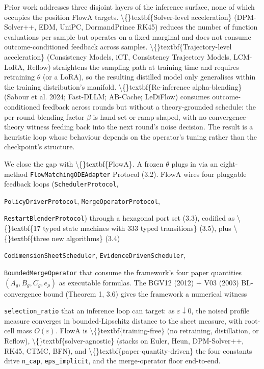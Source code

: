 \documentclass[preprint,3p,times,twocolumn]{elsarticle}
\begin{document}
Prior work addresses three disjoint layers of the inference surface, none of which occupies the position FlowA targets. \textbackslash\{\}textbf\{Solver-level acceleration\} (DPM-Solver++, EDM, UniPC, DormandPrince RK45) reduces the number of function evaluations per sample but operates on a fixed marginal and does not consume outcome-conditioned feedback across samples. \textbackslash\{\}textbf\{Trajectory-level acceleration\} (Consistency Models, iCT, Consistency Trajectory Models, LCM-LoRA, Reflow) straightens the sampling path at training time and requires retraining $\theta$ (or a LoRA), so the resulting distilled model only generalises within the training distribution's manifold. \textbackslash\{\}textbf\{Re-inference alpha-blending\} (Sabour et al. 2024; Fast-DLLM; AB-Cache; LeDiFlow) consumes outcome-conditioned feedback across rounds but without a theory-grounded schedule: the per-round blending factor $\beta$ is hand-set or ramp-shaped, with no convergence-theory witness feeding back into the next round's noise decision. The result is a heuristic loop whose behaviour depends on the operator's tuning rather than the checkpoint's structure.

We close the gap with \textbackslash\{\}textbf\{FlowA\}. A frozen $\theta$ plugs in via an eight-method \texttt{FlowMatchingODEAdapter} Protocol (3.2). FlowA wires four pluggable feedback loops (\texttt{SchedulerProtocol},

\texttt{PolicyDriverProtocol}, \texttt{MergeOperatorProtocol},

\texttt{RestartBlenderProtocol}) through a hexagonal port set (3.3), codified as \textbackslash\{\}textbf\{17 typed state machines with 333 typed transitions\} (3.5), plus \textbackslash\{\}textbf\{three new algorithms\} (3.4) 

\texttt{CodimensionSheetScheduler}, \texttt{EvidenceDrivenScheduler},

\texttt{BoundedMergeOperator}  that consume the framework's four paper quantities $(A_g, B_g, C_g, e_\rho)$ as executable formulas. The BGV12 (2012) + V03 (2003) BL-convergence bound (Theorem 1, 3.6) gives the framework a numerical witness

\texttt{selection\_ratio} that an inference loop can target: as $\varepsilon \downarrow 0$, the noised profile measure converges in bounded-Lipschitz distance to the sheet measure, with root-cell mass $O(\varepsilon)$. FlowA is \textbackslash\{\}textbf\{training-free\} (no retraining, distillation, or Reflow), \textbackslash\{\}textbf\{solver-agnostic\} (stacks on Euler, Heun, DPM-Solver++, RK45, CTMC, BFN), and \textbackslash\{\}textbf\{paper-quantity-driven\}  the four constants drive \texttt{n\_cap}, \texttt{eps\_implicit}, and the merge-operator floor end-to-end.
\end{document}
